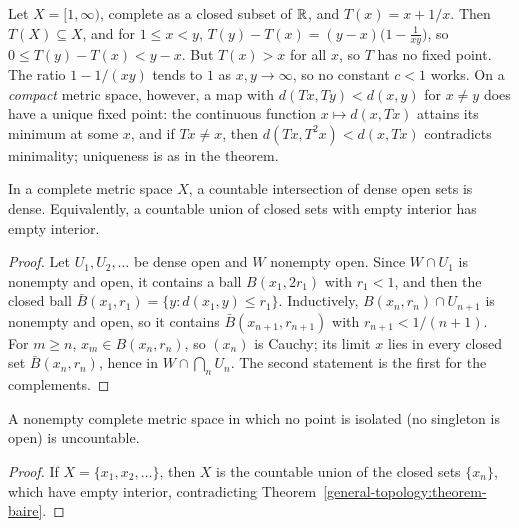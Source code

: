 \begin{counterexample}\label{general-topology:counterexample-weak-contraction}
Let $X = [1, \infty)$, complete as a closed subset of $\mathbb{R}$, and $T(x) = x + 1/x$. Then $T(X) \subseteq X$, and for $1 \leq x < y$,
$T(y) - T(x) = (y - x)\bigl(1 - \frac{1}{xy}\bigr)$, so $0 \leq T(y) - T(x) < y - x$. But $T(x) > x$ for all $x$, so $T$ has no fixed point. The ratio $1 - 1/(xy)$ tends to $1$ as $x, y \to \infty$, so
no constant $c < 1$ works. On a \emph{compact} metric space, however, a map with $d(Tx, Ty) < d(x, y)$ for $x \neq y$ does have a unique fixed point: the continuous function $x \mapsto d(x, Tx)$ attains its
minimum at some $x$, and if $Tx \neq x$, then $d(Tx, T^2x) < d(x, Tx)$ contradicts minimality; uniqueness is as in the theorem.
\end{counterexample}

\begin{theorem}\label{general-topology:theorem-baire}
In a complete metric space $X$, a countable intersection of dense open sets is dense. Equivalently, a countable union of closed sets with empty interior
has empty interior.
\end{theorem}

\begin{proof}
Let $U_1, U_2, \ldots$ be dense open and $W$ nonempty open. Since $W \cap U_1$ is nonempty and open, it contains a ball $B(x_1, 2r_1)$ with $r_1 < 1$, and
then the closed ball $\bar{B}(x_1, r_1) = \{y : d(x_1, y) \leq r_1\}$. Inductively, $B(x_n, r_n) \cap U_{n+1}$ is nonempty and open, so it contains
$\bar{B}(x_{n+1}, r_{n+1})$ with $r_{n+1} < 1/(n+1)$. For $m \geq n$, $x_m \in B(x_n, r_n)$, so $(x_n)$ is Cauchy; its limit $x$ lies in every closed set
$\bar{B}(x_n, r_n)$, hence in $W \cap \bigcap_n U_n$. The second statement is the first for the complements.
\end{proof}

\begin{corollary}\label{general-topology:corollary-baire-uncountable}
A nonempty complete metric space in which no point is isolated (no singleton is open) is uncountable.
\end{corollary}

\begin{proof}
If $X = \{x_1, x_2, \ldots\}$, then $X$ is the countable union of the closed sets $\{x_n\}$, which have empty interior, contradicting
Theorem~\ref{general-topology:theorem-baire}.
\end{proof}

